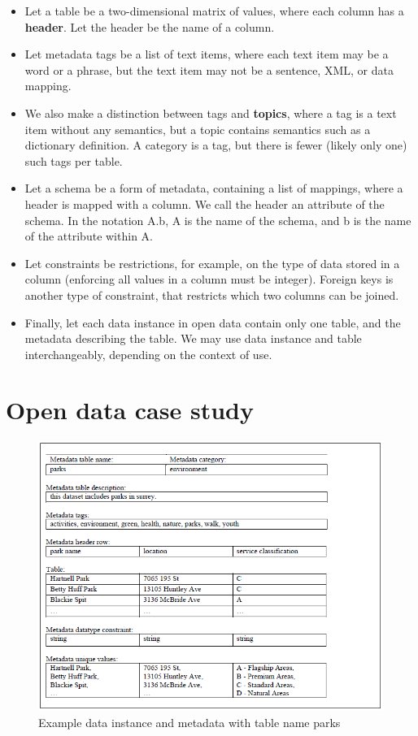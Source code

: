 \begin{itemize}
\item Let a table be a two-dimensional matrix of values, where each column has a \textbf{\gls{header}}. Let the header be the name of a column.
\item Let metadata tags be a list of text items, where each text item may be a word or a phrase, but the text item may not be a sentence, XML, or data mapping.
\item We also make a distinction between tags and \textbf{\glspl{topic}}, where a tag is a text item without any semantics, but a topic contains semantics such as a dictionary definition. A category is a tag, but there is fewer (likely only one) such tags per table.
\item Let a schema be a form of metadata, containing a list of mappings, where a header is mapped with a column. We call the header an attribute of the schema. In the notation A.b, A is the name of the schema, and b is the name of the attribute within A.
\item Let constraints be restrictions, for example, on the type of data stored in a column (enforcing all values in a column must be integer). Foreign keys is another type of constraint, that restricts which two columns can be joined.
\item Finally, let each data instance in open data contain only one table, and the metadata describing the table. We may use data instance and table interchangeably, depending on the context of use.
\end{itemize}

\section{Open data case study}
\label{sec:OpenDataCaseStudy}

\begin{figure}
    \centering
    \includegraphics[width=5in]{figures/example-parks.png}
    \caption{Example data instance and metadata with table name parks}
    \label{fig:example-parks}
\end{figure}


